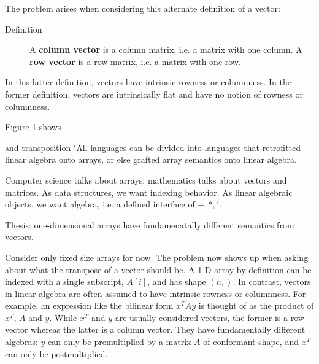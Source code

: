 The problem arises when considering this alternate definition of a
vector:
\begin{description}
\item [{Definition}] A \textbf{column vector} is a column matrix, i.e.
a matrix with one column. A \textbf{row vector} is a row matrix, i.e.
a matrix with one row.
\end{description}
In this latter definition, vectors have intrinsic rowness or columnness.
In the former definition, vectors are intrinsically flat and have
no notion of rowness or columnness.

Figure 1 shows

and transposition $\prime$All languages can be divided into languages
that retrofitted linear algebra onto arrays, or else grafted array
semantics onto linear algebra.

Computer science talks about arrays; mathematics talks about vectors
and matrices. As data structures, we want indexing behavior. As linear
algebraic objects, we want algebra, i.e. a defined interface of $+,*,'$.

Thesis: one-dimensional arrays have fundamenatally different semantics
from vectors.

Consider only fixed size arrays for now. The problem now shows up
when asking about what the transpose of a vector should be. A 1-D
array by definition can be indexed with a single subscript, $A[i]$,
and has shape $\left(n,\right)$. In contrast, vectors in linear algebra
are often assumed to have intrinsic rowness or columnness. For example,
an expression like the bilinear form $x^{T}Ay$ is thought of as the
product of $x^{T}$, $A$ and $y$. While $x^{T}$ and $y$ are usually
considered vectors, the former is a row vector whereas the latter
is a column vector. They have fundamentally different algebras: $y$
can only be premultiplied by a matrix $A$ of conformant shape, and
$x^{T}$ can only be postmultiplied.

